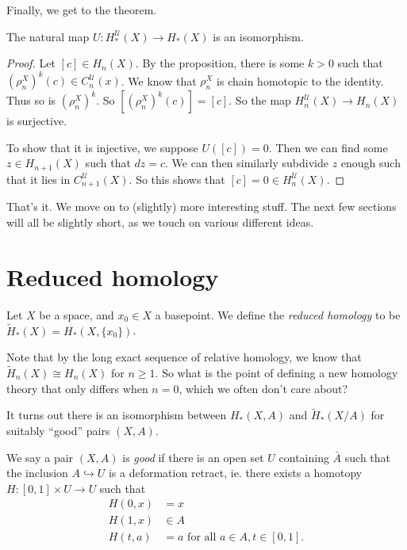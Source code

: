 \documentclass[a4paper]{article}
\theoremstyle{definition}
\begin{document}
Finally, we get to the theorem.
\begin{thm}
  The natural map $U: H_*^\mathcal{U}(X) \to H_*(X)$ is an isomorphism.
\end{thm}

\begin{proof}
  Let $[c] \in H_n(X)$. By the proposition, there is some $k > 0$ such that $(\rho_n^X)^k (c) \in C_n^{\mathcal{U}}(x)$. We know that $\rho_n^X$ is chain homotopic to the identity. Thus so is $(\rho_n^X)^k$. So $[(\rho_n^X)^k (c)] = [c]$. So the map $H_n^\mathcal{U}(X) \to H_n(X)$ is surjective.

  To show that it is injective, we suppose $U([c]) = 0$. Then we can find some $z \in H_{n + 1}(X)$ such that $dz = c$. We can then similarly subdivide $z$ enough such that it lies in $C^\mathcal{U}_{n + 1}(X)$. So this shows that $[c] = 0 \in H_n^{\mathcal{U}}(X)$.
\end{proof}

That's it. We move on to (slightly) more interesting stuff. The next few sections will all be slightly short, as we touch on various different ideas.

\section{Reduced homology}

\begin{defi}
  Let $X$ be a space, and $x_0 \in X$ a basepoint. We define the \emph{reduced homology} to be $\tilde{H}_*(X) = H_*(X, \{x_0\})$.
\end{defi}
Note that by the long exact sequence of relative homology, we know that $\tilde{H}_n(X) \cong H_n(X)$ for $n \geq 1$. So what is the point of defining a new homology theory that only differs when $n = 0$, which we often don't care about?

It turns out there is an isomorphism between $H_*(X, A)$ and $\tilde{H}_*(X/A)$ for suitably ``good'' pairs $(X, A)$.

\begin{defi}
  We say a pair $(X, A)$ is \emph{good} if there is an open set $U$ containing $\bar{A}$ such that the inclusion $A \hookrightarrow U$ is a deformation retract, ie. there exists a homotopy $H: [0, 1] \times U \to U$ such that
  \begin{align*}
    H(0, x) &= x\\
    H(1, x) &\in A\\
    H(t, a) &= a\text{ for all $a \in A, t \in [0, 1]$}.
  \end{align*}
\end{defi}
\end{document}
